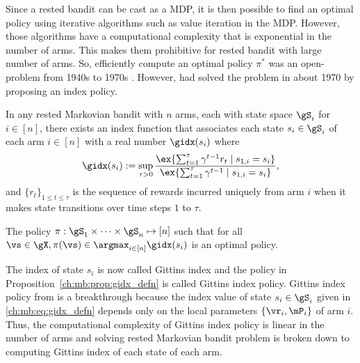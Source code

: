 Since a rested bandit can be cast as a MDP, it is then possible to find an optimal policy using iterative algorithms such as value iteration in the MDP.
However, those algorithms have a computational complexity that is exponential in the number of arms.
This makes them prohibitive for rested bandit with large number of arms.
So, efficiently compute an optimal policy $\pi^*$ was an open-problem from 1940s to 1970s \cite{whittle1996optimal}.
However, \cite{gittins1979bandit} had solved the problem in about 1970 by proposing an index policy.
\begin{prop}
    \label{ch:mb:prop:gidx_defn}
    In any rested Markovian bandit with $n$ arms, each with state space $\gS_i$ for $i\in[n]$, there exists an index function that associates each state $s_i\in\gS_i$ of each arm $i\in[n]$ with a real number $\gidx(s_i)$ where
    \begin{equation}
        \label{ch:mb:eq:gidx_defn}
        \gidx(s_i):=\sup_{\tau>0}\frac{\ex{\sum_{t=1}^{\tau}\gamma^{t-1}r_t \mid s_{1,i}=s_i}}{\ex{\sum_{t=1}^{\tau}\gamma^{t-1}\mid s_{1,i}=s_i}}, 
    \end{equation}
    and $\{r_t\}_{1\le t\le\tau}$ is the sequence of rewards incurred uniquely from arm $i$ when it makes state transitions over time steps $1$ to $\tau$.

    The policy $\pi:\gS_1\times\dots\times\gS_n\mapsto[n]$ such that for all $\vs\in\gX, \pi(\vs)\in\argmax_{i\in[n]}\gidx(s_i)$ is an optimal policy.
\end{prop}
The index of state $s_i$ is now called Gittins index and the policy in Proposition~\ref{ch:mb:prop:gidx_defn} is called Gittins index policy.
Gittins index policy from \cite{gittins1979bandit} is a breakthrough because the index value of state $s_i\in\gS_i$ given in \eqref{ch:mb:eq:gidx_defn} depends only on the local parameters $\{\vr_i,\mP_i\}$ of arm $i$.
Thus, the computational complexity of Gittins index policy is linear in the number of arms and solving rested Markovian bandit problem is broken down to computing Gittins index of each state of each arm.

